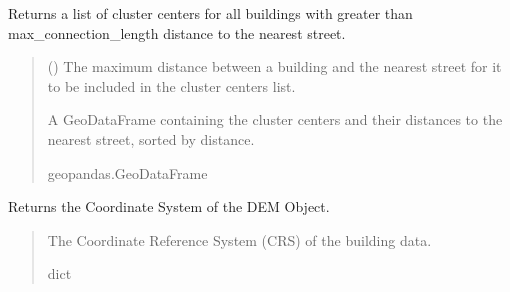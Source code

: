 \documentclass[letterpaper,10pt,english]{sphinxmanual}
\begin{document}
\begin{fulllineitems}
\begin{fulllineitems}
\label{\detokenize{pysewer:pysewer.preprocessing.Buildings.cluster_centers}}
\pysigstartsignatures
{}
\pysigstopsignatures
\sphinxAtStartPar
Returns a list of cluster centers for all buildings with greater than max\_connection\_length distance to the nearest street.
\begin{quote}\begin{description}
\sphinxAtStartPar
{} () \textendash{} The maximum distance between a building and the nearest street for it to be included in the cluster centers list.

\sphinxAtStartPar
A GeoDataFrame containing the cluster centers and their distances to the nearest street, sorted by distance.

\sphinxAtStartPar
geopandas.GeoDataFrame

\end{description}\end{quote}

\end{fulllineitems}


\begin{fulllineitems}
\label{\detokenize{pysewer:pysewer.preprocessing.Buildings.get_crs}}
\pysigstartsignatures
{}
\pysigstopsignatures
\sphinxAtStartPar
Returns the Coordinate System of the DEM Object.
\begin{quote}\begin{description}
\sphinxAtStartPar
The Coordinate Reference System (CRS) of the building data.

\sphinxAtStartPar
dict

\end{description}\end{quote}

\end{fulllineitems}


\end{fulllineitems}
\end{document}
